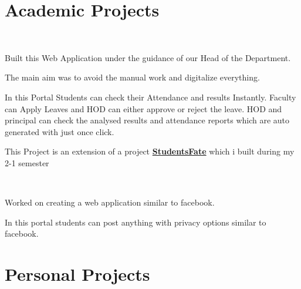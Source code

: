 \documentclass[]{deedy-resume-openfont}
\begin{document}
\begin{minipage}[t]{0.66\textwidth}

\section{Academic Projects}
\\
\begin{tightemize}
\item Built this Web Application under the guidance of our Head of the Department. 
\item The main aim was to avoid the manual work and digitalize everything. \item In this Portal Students can check their Attendance and results Instantly. Faculty can Apply Leaves and HOD can either approve or reject the leave. HOD and principal can check the analysed results and attendance reports which are auto generated with just once click.
\item This Project is an extension of a project \textbf{\href{http://studentsfate.phpnet.us/}{StudentsFate}} which i built during my 2-1 semester
\end{tightemize}
\sectionsep

\\
\begin{tightemize}
\item Worked on creating a web application similar to facebook.
\item In this portal students can post anything with privacy options similar to facebook.
\end{tightemize}
\sectionsep


\section{Personal Projects}

\\
\vspace{\topsep}
\\
\sectionsep

\nocite{*}

\end{minipage} 
\end{document}
